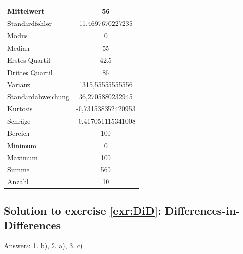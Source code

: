 \documentclass[
  12pt,
  oneside]{book}
\theoremstyle{definition}
\theoremstyle{definition}
\theoremstyle{definition}
\theoremstyle{definition}
\theoremstyle{remark}
\begin{document}
\begin{longtable}[]{@{}lc@{}}
\toprule\noalign{}
Mittelwert & 56 \\
\midrule\noalign{}
\endhead
\bottomrule\noalign{}
\endlastfoot
Standardfehler & 11,4697670227235 \\
Modus & 0 \\
Median & 55 \\
Erstes Quartil & 42,5 \\
Drittes Quartil & 85 \\
Varianz & 1315,55555555556 \\
Standardabweichung & 36,2705880232945 \\
Kurtosis & -0,731538352420953 \\
Schräge & -0,417051115341008 \\
Bereich & 100 \\
Minimum & 0 \\
Maximum & 100 \\
Summe & 560 \\
Anzahl & 10 \\
\end{longtable}

\hypertarget{sol:DiD}{%
\subsection*{Solution to exercise \ref{exr:DiD}: Differences-in-Differences}\label{sol:DiD}}

Answers: 1. b), 2. a), 3. c)

  
\end{document}
